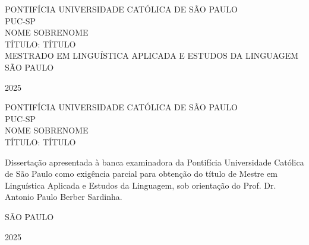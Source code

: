 \begin{titlepage}
    \begin{center}
        {\large \MakeUppercase{Pontifícia Universidade Católica de São Paulo}}\\
        {\large \MakeUppercase{PUC-SP}}\\
        \vspace{5cm}
        {\large \MakeUppercase{Nome Sobrenome}}\\
        \vspace{5cm}
        {\Large \MakeUppercase{Título: título}}\\
        \vspace{5cm}
        {\large \MakeUppercase{Mestrado em Linguística Aplicada e Estudos da Linguagem}}
        \vfill
        {\large \MakeUppercase{São Paulo}}
        
        {\large 2025}
    \end{center}
\end{titlepage}

\begin{titlepage}
    \begin{center}
        {\large \MakeUppercase{Pontifícia Universidade Católica de São Paulo}}\\
        {\large \MakeUppercase{PUC-SP}}\\
        \vspace{5cm}
        {\large \MakeUppercase{Nome Sobrenome}}\\
        \vspace{5cm}
        {\Large \MakeUppercase{Título: título}}\\
        \vspace{3cm}
        \begin{adjustwidth}{0.5\textwidth}{0cm}
            Dissertação apresentada à banca examinadora da Pontifícia Universidade Católica de São Paulo como exigência parcial para obtenção do título de Mestre em Linguística Aplicada e Estudos da Linguagem, sob orientação do Prof. Dr. Antonio Paulo Berber Sardinha.
        \end{adjustwidth}
        \vfill
        {\large \MakeUppercase{São Paulo}}
        
        {\large 2025}
    \end{center}
\end{titlepage}

